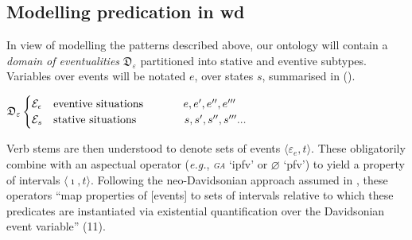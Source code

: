 \subsection{Modelling predication in \gls{wd}}
In view of modelling the patterns described above, our ontology will contain a \textit{domain of eventualities} $ \mathfrak D_\varepsilon $ partitioned into stative and eventive subtypes. Variables over events will be notated $ e $, over states $ s $, summarised in (\nextx).

\ex $ \mathfrak D_\varepsilon \begin{cases}
	\mathcal E_\epsilon	& \text{eventive situations}\hspace{.5in} e,e',e'',e'''\\
	\mathcal E_s	& \text{stative situations}\hspace{.6in} s,s',s'',s'''...
\end{cases} $\xe


Verb stems are then understood to denote sets of events $ \langle \varepsilon_e,t\rangle $. These obligatorily combine with an aspectual operator (\textit{e.g.}, \textit{\textsc{ga}} `\gls{ipfv}' or $ \varnothing $ `\gls{pfv}') %
to yield a property of intervals $ \langle\imath,t\rangle $. Following the neo-Davidsonian approach assumed in \citet{Deo2015}, these operators ``map properties of [events] to sets of intervals relative to which these predicates are instantiated via existential quantification over the Davidsonian event variable'' (11).



